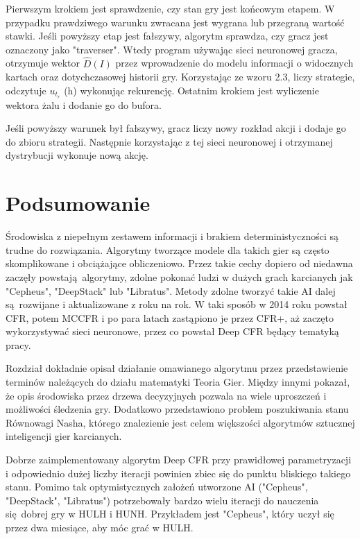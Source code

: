 \documentclass[12pt,oneside,a4paper]{report}
\begin{document}
Pierwszym krokiem jest sprawdzenie, czy stan gry jest końcowym etapem. W przypadku prawdziwego 
warunku zwracana jest wygrana lub przegraną wartość stawki. 
Jeśli powyższy etap jest fałszywy, algorytm sprawdza, czy gracz jest oznaczony jako "traverser".
Wtedy program używając sieci neuronowej gracza,
otrzymuje wektor $\hat{D}(I)$ przez wprowadzenie do modelu informacji o widocznych kartach oraz
dotychczasowej historii gry. Korzystając ze wzoru 2.3, liczy strategie, odczytuje $u_{t_{r}}$ (h) 
wykonując rekurencję. Ostatnim krokiem jest wyliczenie wektora żalu i dodanie go do bufora.

Jeśli powyższy warunek był fałszywy, gracz liczy nowy rozkład
akcji i dodaje go do zbioru strategii. Następnie korzystając z tej sieci neuronowej i otrzymanej 
dystrybucji wykonuje nową akcję.


\section{Podsumowanie}

Środowiska z niepełnym zestawem informacji i brakiem deterministyczności są trudne do rozwiązania.
Algorytmy tworzące modele
dla takich gier są często skomplikowane i obciążające obliczeniowo. 
Przez takie cechy dopiero od niedawna zaczęły powstają algorytmy, zdolne pokonać ludzi w 
dużych grach karcianych jak "Cepheus", "DeepStack" lub "Libratus". 
Metody zdolne tworzyć takie AI dalej są rozwijane i aktualizowane z roku na rok.
W taki sposób w 2014 roku powstał CFR, potem MCCFR i po para latach zastąpiono je przez CFR+, aż 
zaczęto wykorzystywać sieci neuronowe, przez co powstał 
Deep CFR będący tematyką pracy. 

Rozdział dokładnie opisał działanie omawianego algorytmu
przez przedstawienie terminów należących do działu matematyki Teoria Gier. Między innymi
 pokazał, że opis środowiska przez drzewa decyzyjnych pozwala na wiele uproszczeń i możliwości
 śledzenia gry. Dodatkowo przedstawiono problem poszukiwania stanu Równowagi Nasha, którego
 znalezienie jest celem większości algorytmów sztucznej inteligencji gier karcianych.

Dobrze zaimplementowany algorytm Deep CFR przy prawidłowej parametryzacji i odpowiednio dużej
liczby iteracji powinien zbiec się do punktu bliskiego takiego stanu. Pomimo tak optymistycznych 
założeń utworzone AI ("Cepheus", "DeepStack", "Libratus") potrzebowały bardzo wielu iteracji do 
nauczenia się dobrej gry w HULH i HUNH.
Przykładem jest "Cepheus", który uczył się przez dwa miesiące, aby móc grać w HULH.
\end{document}
